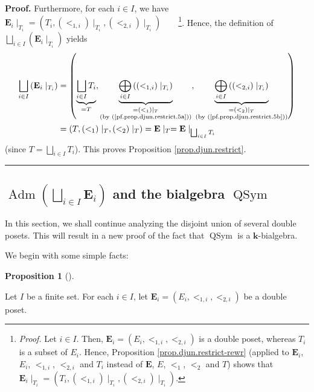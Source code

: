 \documentclass[numbers=enddot,12pt,final,onecolumn,notitlepage,abstracton]{scrartcl}
\theoremstyle{definition}
\newtheorem{prop}[theo]{Proposition}
\newenvironment{proposition}[1][]
{\begin{prop}[#1]\begin{leftbar}}
{\end{leftbar}\end{prop}}
\newenvironment{proof}[1][Proof]{\noindent\textbf{#1.} }{\ \rule{0.5em}{0.5em}}
\newenvironment{verlong}{}{}
\begin{document}
\begin{verlong}
\begin{footnotesize}
\begin{proof}
Furthermore, for each $i\in I$, we have $\mathbf{E}_{i}\mid_{T_{i}}=\left(
T_{i},\left(  <_{1,i}\right)  \mid_{T_{i}},\left(  <_{2,i}\right)  \mid
_{T_{i}}\right)  $\ \ \ \ \footnote{\textit{Proof.} Let $i\in I$. Then,
$\mathbf{E}_{i}=\left(  E_{i},<_{1,i},<_{2,i}\right)  $ is a double poset,
whereas $T_{i}$ is a subset of $E_{i}$. Hence, Proposition
\ref{prop.djun.restrict-rewr} (applied to $\mathbf{E}_{i}$, $E_{i}$, $<_{1,i}%
$, $<_{2,i}$ and $T_{i}$ instead of $\mathbf{E}$, $E$, $<_{1}$, $<_{2}$ and
$T$) shows that $\mathbf{E}_{i}\mid_{T_{i}}=\left(  T_{i},\left(
<_{1,i}\right)  \mid_{T_{i}},\left(  <_{2,i}\right)  \mid_{T_{i}}\right)  $.}.
Hence, the definition of $\bigsqcup_{i\in I}\left(  \mathbf{E}_{i}\mid_{T_{i}%
}\right)  $ yields%
\begin{align*}
\bigsqcup_{i\in I}\left(  \mathbf{E}_{i}\mid_{T_{i}}\right)   &  =\left(
\underbrace{\bigsqcup_{i\in I}T_{i}}_{=T},\underbrace{\bigoplus_{i\in
I}\left(  \left(  <_{1,i}\right)  \mid_{T_{i}}\right)  }_{\substack{=\left(
<_{1}\right)  \mid_{T}\\\text{(by (\ref{pf.prop.djun.restrict.5a}))}%
}},\underbrace{\bigoplus_{i\in I}\left(  \left(  <_{2,i}\right)  \mid_{T_{i}%
}\right)  }_{\substack{=\left(  <_{2}\right)  \mid_{T}\\\text{(by
(\ref{pf.prop.djun.restrict.5b}))}}}\right) \\
&  =\left(  T,\left(  <_{1}\right)  \mid_{T},\left(  <_{2}\right)  \mid
_{T}\right)  =\mathbf{E}\mid_{T}=\mathbf{E}\mid_{\bigsqcup_{i\in I}T_{i}}%
\end{align*}
(since $T=\bigsqcup_{i\in I}T_{i}$). This proves Proposition
\ref{prop.djun.restrict}.
\end{proof}

\subsection{$\operatorname*{Adm}\left(  \bigsqcup_{i\in I}\mathbf{E}%
_{i}\right)  $ and the bialgebra $\operatorname*{QSym}$}

In this section, we shall continue analyzing the disjoint union of several
double posets. This will result in a new proof of the fact that
$\operatorname*{QSym}$ is a $\mathbf{k}$-bialgebra.

We begin with some simple facts:

\begin{proposition}
\label{prop.djun.Adm1}Let $I$ be a finite set. For each $i\in I$, let
$\mathbf{E}_{i}=\left(  E_{i},<_{1,i},<_{2,i}\right)  $ be a double poset.


\end{proposition}
\end{footnotesize}
\end{verlong}
\end{document}
